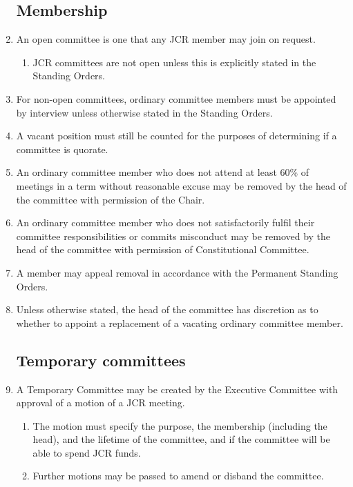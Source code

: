 \documentclass[12pt]{article}
\begin{document}
\begin{enumerate}
    \subsection{Membership}
    \item An open committee is one that any JCR member may join on request.
    \begin{enumerate}
        \item JCR committees are not open unless this is explicitly stated in the Standing Orders.
    \end{enumerate}
    \item For non-open committees, ordinary committee members must be appointed by interview unless otherwise stated in the Standing Orders.
    \item \label{vacant-quorum}A vacant position must still be counted for the purposes of determining if a committee is quorate.
    \item An ordinary committee member who does not attend at least 60\% of meetings in a term without reasonable excuse may be removed by the head of the committee with permission of the Chair.
    \item An ordinary committee member who does not satisfactorily fulfil their committee responsibilities or commits misconduct may be removed by the head of the committee with permission of Constitutional Committee.
    \item A member may appeal removal in accordance with the Permanent Standing Orders.
    \item Unless otherwise stated, the head of the committee has discretion as to whether to appoint a replacement of a vacating ordinary committee member.
    \subsection{Temporary committees}
    \item A Temporary Committee may be created by the Executive Committee with approval of a motion of a JCR meeting.
    \begin{enumerate}
        \item The motion must specify the purpose, the membership (including the head), and the lifetime of the committee, and if the committee will be able to spend JCR funds.
        \item Further motions may be passed to amend or disband the committee.
    \end{enumerate}
\end{enumerate}
\end{document}
